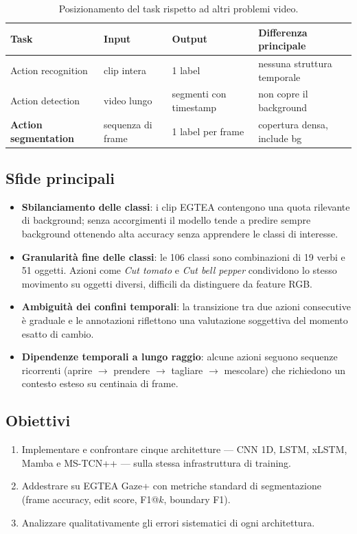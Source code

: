 \documentclass[12pt, a4paper]{article}
\begin{document}
\begin{table}[H]
\centering
\caption{Posizionamento del task rispetto ad altri problemi video.}
\begin{tabular}{llll}
\toprule
\textbf{Task} & \textbf{Input} & \textbf{Output} & \textbf{Differenza principale} \\
\midrule
Action recognition  & clip intera        & 1 label                   & nessuna struttura temporale \\
Action detection    & video lungo        & segmenti con timestamp    & non copre il background \\
\textbf{Action segmentation} & sequenza di frame & 1 label per frame & copertura densa, include bg \\
\bottomrule
\end{tabular}
\end{table}

\subsection{Sfide principali}
\begin{itemize}
  \item \textbf{Sbilanciamento delle classi}: i clip EGTEA contengono una quota
        rilevante di background; senza accorgimenti il modello tende a predire
        sempre background ottenendo alta accuracy senza apprendere le classi
        di interesse.
  \item \textbf{Granularit\`a fine delle classi}: le 106 classi sono combinazioni
        di 19 verbi e 51 oggetti. Azioni come \textit{Cut tomato} e
        \textit{Cut bell pepper} condividono lo stesso movimento su oggetti
        diversi, difficili da distinguere da feature RGB.
  \item \textbf{Ambiguit\`a dei confini temporali}: la transizione tra due azioni
        consecutive \`e graduale e le annotazioni riflettono una valutazione
        soggettiva del momento esatto di cambio.
  \item \textbf{Dipendenze temporali a lungo raggio}: alcune azioni seguono
        sequenze ricorrenti (aprire $\to$ prendere $\to$ tagliare $\to$ mescolare)
        che richiedono un contesto esteso su centinaia di frame.
\end{itemize}

\subsection{Obiettivi}
\begin{enumerate}
  \item Implementare e confrontare cinque architetture --- CNN 1D, LSTM,
        xLSTM, Mamba e MS-TCN++ --- sulla stessa infrastruttura di training.
  \item Addestrare su EGTEA Gaze+ con metriche standard di segmentazione
        (frame accuracy, edit score, F1@$k$, boundary F1).
  \item Analizzare qualitativamente gli errori sistematici di ogni architettura.
\end{enumerate}
\end{document}
